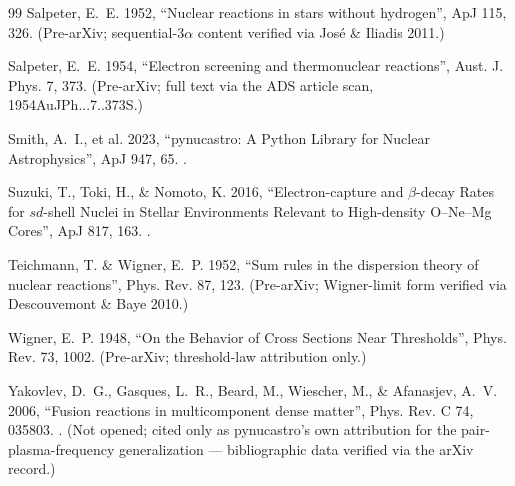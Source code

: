 \begin{thebibliography}{99}
Salpeter, E.~E. 1952, ``Nuclear reactions in stars without hydrogen'', ApJ 115,
326. (Pre-arXiv; sequential-$3\alpha$ content verified via Jos\'e \& Iliadis
2011.)

Salpeter, E.~E. 1954, ``Electron screening and thermonuclear reactions'', Aust.
J. Phys. 7, 373. (Pre-arXiv; full text via the ADS article scan,
1954AuJPh...7..373S.)

Smith, A.~I., et al. 2023, ``pynucastro: A Python Library for Nuclear
Astrophysics'', ApJ 947, 65. .

Suzuki, T., Toki, H., \& Nomoto, K. 2016, ``Electron-capture and $\beta$-decay
Rates for $sd$-shell Nuclei in Stellar Environments Relevant to High-density
O--Ne--Mg Cores'', ApJ 817, 163. .

Teichmann, T. \& Wigner, E.~P. 1952, ``Sum rules in the dispersion theory of
nuclear reactions'', Phys. Rev. 87, 123. (Pre-arXiv; Wigner-limit form verified
via Descouvemont \& Baye 2010.)

Wigner, E.~P. 1948, ``On the Behavior of Cross Sections Near Thresholds'',
Phys. Rev. 73, 1002. (Pre-arXiv; threshold-law attribution only.)

Yakovlev, D.~G., Gasques, L.~R., Beard, M., Wiescher, M., \& Afanasjev, A.~V.
2006, ``Fusion reactions in multicomponent dense matter'', Phys. Rev. C 74,
035803. . (Not opened; cited only as pynucastro's own
attribution for the pair-plasma-frequency generalization --- bibliographic data
verified via the arXiv record.)

\end{thebibliography}
\endgroup
